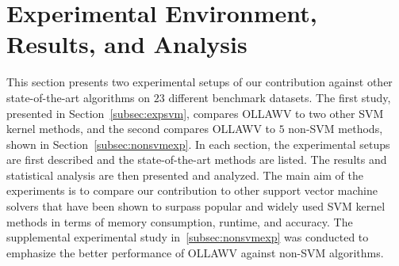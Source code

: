 \documentclass[reqno]{vcuthesis}
\numberwithin{equation}{chapter}
\begin{document}
\section{Experimental Environment, Results, and Analysis}\label{sec:exp}
This section presents two experimental setups of our contribution against other state-of-the-art algorithms on $23$ different benchmark datasets. The first study, presented in Section~\ref{subsec:expsvm}, compares OLLAWV to two other SVM kernel methods, and the second compares OLLAWV to $5$ non-SVM methods, shown in Section~\ref{subsec:nonsvmexp}. In each section, the experimental setups are first described and the state-of-the-art methods are listed. The results and statistical analysis are then presented and analyzed. The main aim of the experiments is to compare our contribution to other support vector machine solvers that have been shown to surpass popular and widely used SVM kernel methods in terms of memory consumption, runtime, and accuracy. The supplemental experimental study in~\ref{subsec:nonsvmexp} was conducted to emphasize the better performance of OLLAWV against non-SVM algorithms.
\end{document}
